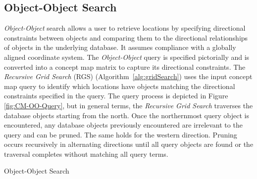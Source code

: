 {\subsection{Object-Object Search}

\textit{Object-Object} search allows a user to retrieve locations by specifying directional constraints between objects and comparing them to the directional relationships of objects in the underlying database. 
It assumes compliance with a globally aligned coordinate system.
The \textit{Object-Object} query is specified pictorially and is converted into a concept map matrix to capture its directional constraints.
The \textit{Recursive Grid Search} (RGS) (Algorithm~\ref{alg:gridSearch}) uses the input concept map query to identify which locations have objects matching the directional constraints specified in the query. 
The query process is depicted in Figure \ref{fig:CM-OO-Query}, but in general terms, the \textit{Recursive Grid Search} traverses the database objects starting from the north.
Once the northernmost query object is encountered, any database objects previously encountered are irrelevant to the query and can be pruned.
The same holds for the western direction.
Pruning occurs recursively in alternating directions until all query objects are found or the traversal completes without matching all query terms.


\begin{algorithm}[h!]
    \caption{Object-Object Search}\label{alg:gridSearch}
    \begin{algorithmic}
        \State{- - - - -}
        \EndProcedure
        

\end{algorithmic}
\end{algorithm}}
